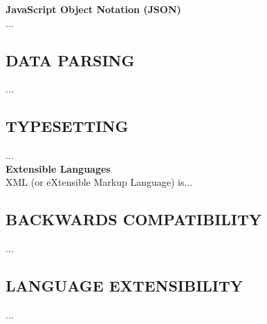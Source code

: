 \documentclass[../report.tex]{subfiles}
\begin{document}



\textbf{JavaScript Object Notation (JSON)} \\

...

\subsection{DATA PARSING}

...

\subsection{TYPESETTING}

... \\

\textbf{Extensible Languages} \\

XML (or eXtensible Markup Language) is...

\subsection{BACKWARDS COMPATIBILITY}

...

\subsection{LANGUAGE EXTENSIBILITY}

...
\end{document}
